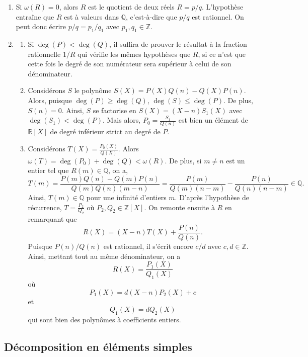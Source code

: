 \documentclass[11pt,a4paper]{article}
\begin{document}
	\begin{corrige}
		\begin{enumerate}
			
			\item  Si $\omega(R)=0$, alors $R$ est le quotient de deux réels $R=p/q$. L'hypothèse entraîne que $R$ est à valeurs dans $\mathbb Q$, c'est-à-dire que $p/q$ est rationnel. On peut donc écrire $p/q=p_1/q_1$ avec $p_1,q_1\in\mathbb Z$.
			
			\item  
			
			\begin{enumerate}
				
				\item  Si $\deg(P)<\deg(Q)$, il suffira de prouver le résultat à la fraction rationnelle $1/R$ qui vérifie les mêmes hypothèses que $R$, si ce n'est que cette fois le degré de son numérateur sera supérieur à celui de son dénominateur.
				
				\item  Considérons $S$ le polynôme $S(X)=P(X)Q(n)-Q(X)P(n)$. Alors, puisque $\deg(P)\geq \deg(Q)$, $\deg(S)\leq \deg(P)$. De plus, $S(n)=0$. Ainsi, $S$ se factorise en $S(X)=(X-n)S_1(X)$ avec $\deg(S_1)<\deg(P)$. Mais alors, $P_0=\frac{S_1}{Q(n)}$ est bien un élément de $\mathbb R[X]$ de degré inférieur strict au degré de $P$.
				
				\item  Considérons $T(X)=\frac{P_0(X)}{Q(X)}$. Alors $\omega(T)=\deg(P_0)+\deg(Q)<\omega(R)$. De plus, si $m\neq n$ est un entier tel que $R(m)\in\mathbb Q$, on a, 
				$$T(m)=\frac{P(m)Q(n)-Q(m)P(n)}{Q(m)Q(n)(m-n)}=\frac{P(m)}{Q(m)(n-m)}-\frac{P(n)}{Q(n)(n-m)}\in\mathbb Q.$$
				Ainsi, $T(m)\in\mathbb Q$ pour une infinité d'entiers $m$. D'après l'hypothèse de récurrence, 
				$T=\frac{P_2}{Q_2}$ 
				où $P_2,Q_2\in \mathbb Z[X]$. On remonte ensuite à $R$ en remarquant que 
				$$R(X)=(X-n)T(X)+\frac{P(n)}{Q(n)}.$$
				Puisque $P(n)/Q(n)$ est rationnel, il s'écrit encore $c/d$ avec $c,d\in\mathbb Z$.
				Ainsi, mettant tout au même dénominateur, on a 
				$$R(X)=\frac{P_1(X)}{Q_1(X)}$$
				où
				$$P_1(X)=d(X-n)P_2(X)+c$$
				et $$Q_1(X)=dQ_2(X)$$
				qui sont bien des polynômes à coefficients entiers.
				
			\end{enumerate}
			
			
		\end{enumerate}
	\end{corrige}
	
	\subsection*{Décomposition en éléments simples}
	
\end{document}
